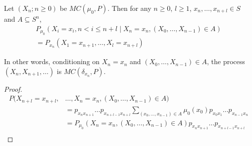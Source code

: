 \begin{theorem}
    Let $(X_n; n \ge 0)$ be $MC(\mu_0, P)$.
    Then for any $n \ge 0$, $l \ge 1$, $x_n, \dots, x_{n+l} \in S$ and
    $A \subseteq S^n$, \begin{multline*}
        P_{\mu_0}(X_i = x_i, n < i \le n + l \mid X_n = x_n, (X_0, \dots, X_{n-1}) \in A) \\
        = P_{x_n}(X_1 = x_{n+1}, \dots, X_l = x_{n+l})
    \end{multline*}
\end{theorem}
In other words, conditioning on $X_n = x_n$ and $(X_0, \dots, X_{n-1}) \in A$,
the process $(X_n, X_{n+1}, \dots)$ is $MC(\delta_{x_n}, P)$.
\begin{proof}
    \begin{align*}
        P(X_{n+l} = x_{n+l}, &\dots, X_n = x_n, (X_0, \dots, X_{n-1}) \in A) \\
            &= p_{x_{n} x_{n+1}} \dots p_{x_{n+l-1} x_{n+l}}
            \sum_{(x_0, \dots, x_{n-1}) \in A} \mu_0(x_0) p_{x_0 x_1} \dots p_{x_{n-1} x_n} \\
            &= P_{\mu_0}(X_n = x_n, (X_0, \dots, X_{n-1}) \in A) p_{x_n x_{n+1}} \dots p_{x_{n+l-1} x_{n+l}} \\
    \end{align*}
\end{proof}
